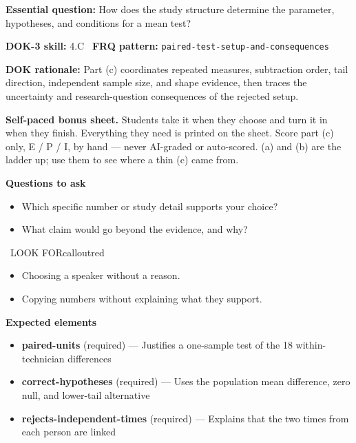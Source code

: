 \documentclass[11pt]{article}
\begin{document}
\textbf{Essential question:} How does the study structure determine the parameter, hypotheses, and conditions for a mean test?\par
\textbf{DOK-3 skill:} 4.C \textperiodcentered\ \textbf{FRQ pattern:} {\small\texttt{paired-\allowbreak{}test-\allowbreak{}setup-\allowbreak{}and-\allowbreak{}consequences}}\par
\textbf{DOK rationale:} Part (c) coordinates repeated measures, subtraction order, tail direction, independent sample size, and shape evidence, then traces the uncertainty and research-question consequences of the rejected setup.\par

\textbf{Self-paced bonus sheet.} Students take it when they choose and turn it in when they finish. Everything they need is printed on the sheet. Score part (c) only, E / P / I, by hand --- never AI-graded or auto-scored. (a) and (b) are the ladder up; use them to see where a thin (c) came from.\par

\textbf{Questions to ask}
\begin{itemize}[leftmargin=1.5em,itemsep=2pt,topsep=2pt]
  \item Which specific number or study detail supports your choice?
  \item What claim would go beyond the evidence, and why?
\end{itemize}

\begin{callout}{\IconWarn\ LOOK FOR}{calloutred}
\begin{itemize}[leftmargin=1.5em,itemsep=2pt,topsep=2pt]
  \item Choosing a speaker without a reason.
  \item Copying numbers without explaining what they support.
\end{itemize}
\end{callout}


\textbf{Expected elements}
\begin{itemize}[leftmargin=1.5em,itemsep=2pt,topsep=2pt]
  \item \textbf{paired-units} (required) --- Justifies a one-sample test of the 18 within-technician differences
  \item \textbf{correct-hypotheses} (required) --- Uses the population mean difference, zero null, and lower-tail alternative
  \item \textbf{rejects-independent-times} (required) --- Explains that the two times from each person are linked
\end{itemize}
\end{document}
